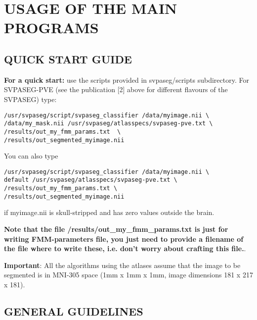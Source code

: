 \documentclass[12pt]{article}
\begin{document}
\section{USAGE OF THE MAIN PROGRAMS}

\subsection{QUICK START GUIDE}

{\bf For a quick start:} use the scripts provided in svpaseg/scripts subdirectory. 
For SVPASEG-PVE (see the publication [2] above for different flavours of the SVPASEG) type:
\begin{verbatim}
/usr/svpaseg/script/svpaseg_classifier /data/myimage.nii \ 
/data/my_mask.nii /usr/svpaseg/atlasspecs/svpaseg-pve.txt \
/results/out_my_fmm_params.txt  \
/results/out_segmented_myimage.nii
\end{verbatim} 
You can also type 
\begin{verbatim}
/usr/svpaseg/script/svpaseg_classifier /data/myimage.nii \
default /usr/svpaseg/atlasspecs/svpaseg-pve.txt \  
/results/out_my_fmm_params.txt \ 
/results/out_segmented_myimage.nii
\end{verbatim} 
if myimage.nii is skull-stripped and has zero values outside the brain. 

{\bf Note that the file /results/out\_my\_fmm\_params.txt is just for writing FMM-parameters file, you just need to provide a filename of the file where to write these, i.e. don't worry about crafting this file.}.

{\bf Important}:  All the algorithms using the atlases assume that the image to be segmented is in MNI-305 space (1mm x 1mm x 1mm, image dimensions 181 x 217 x 181).

\subsection{GENERAL GUIDELINES}
\end{document}
